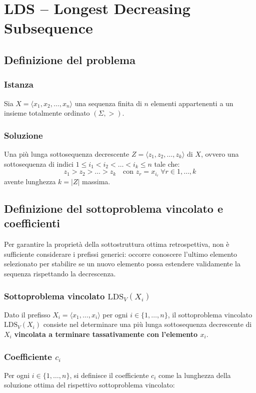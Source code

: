 \chapter{LDS -- Longest Decreasing Subsequence}\section{Definizione del problema}\subsection{Istanza}
Sia $X = \langle x_1, x_2, \dots, x_n \rangle$ una sequenza finita di $n$ elementi appartenenti a un insieme totalmente ordinato $(\Sigma, >)$.\subsection{Soluzione}
Una più lunga sottosequenza decrescente $Z = \langle z_1, z_2, \dots, z_k \rangle$ di $X$, ovvero una sottosequenza di indici $1 \le i_1 < i_2 < \dots < i_k \le n$ tale che:
\begin{equation*}
z_1 > z_2 > \dots > z_k \quad \text{con } z_r = x_{i_r} \ \forall r \in {1, \dots, k}
\end{equation*}
avente lunghezza $k = \vert{}Z\vert{}$ massima.\section{Definizione del sottoproblema vincolato e coefficienti}Per garantire la proprietà della sottostruttura ottima retrospettiva, non è sufficiente considerare i prefissi generici: occorre conoscere l'ultimo elemento selezionato per stabilire se un nuovo elemento possa estendere validamente la sequenza rispettando la decrescenza.\subsection{Sottoproblema vincolato $\text{LDS}_V(X_i)$}
Dato il prefisso $X_i = \langle x_1, \dots, x_i \rangle$ per ogni $i \in \{1, \dots, n\}$, il sottoproblema vincolato $\text{LDS}_V(X_i)$ consiste nel determinare una più lunga sottosequenza decrescente di $X_i$ \textbf{vincolata a terminare tassativamente con l'elemento $x_i$}.\subsection{Coefficiente $c_i$}
Per ogni $i \in \{1, \dots, n\}$, si definisce il coefficiente $c_i$ come la lunghezza della soluzione ottima del rispettivo sottoproblema vincolato:
